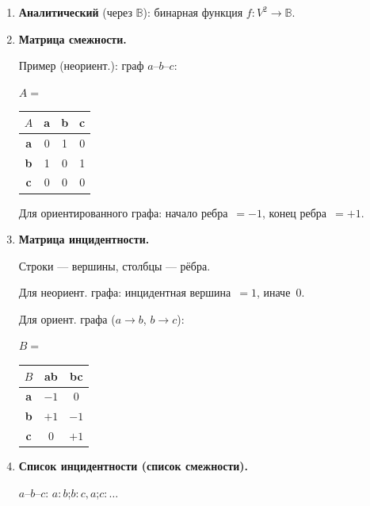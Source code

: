 \begin{enumerate}
  \item \textbf{Аналитический} (через $\mathbb{B}$): бинарная функция $f\colon V^2 \to \mathbb{B}$.

  \item \textbf{Матрица смежности.}

        Пример (неориент.): граф $a$--$b$--$c$:
        \begin{center}
        \renewcommand{\arraystretch}{1.25}
        $A=$\;
        \begin{tabular}{|c||c|c|c|}
        \hline
        $A$ & \textbf{a} & \textbf{b} & \textbf{c} \\ \hline\hline
        \textbf{a} & 0 & 1 & 0 \\ \hline
        \textbf{b} & 1 & 0 & 1 \\ \hline
        \textbf{c} & 0 & 0 & 0 \\ \hline
        \end{tabular}
        \end{center}

        Для ориентированного графа: начало ребра~$= -1$, конец ребра~$= +1$.

  \item \textbf{Матрица инцидентности.}

        Строки --- вершины, столбцы --- рёбра.

        Для неориент. графа: инцидентная вершина~$= 1$, иначе~$0$.

        Для ориент. графа ($a \to b$, $b \to c$):
        \begin{center}
        \renewcommand{\arraystretch}{1.25}
        $B=$\;
        \begin{tabular}{|c||c|c|}
        \hline
        $B$ & \textbf{ab} & \textbf{bc} \\ \hline\hline
        \textbf{a} & $-1$ & $0$  \\ \hline
        \textbf{b} & $+1$ & $-1$ \\ \hline
        \textbf{c} & $0$  & $+1$ \\ \hline
        \end{tabular}
        \end{center}

  \item \textbf{Список инцидентности (список смежности).}

        $a$--$b$--$c$:\quad
        $a\colon b$;\quad $b\colon c, a$;\quad $c\colon \ldots$
\end{enumerate}

